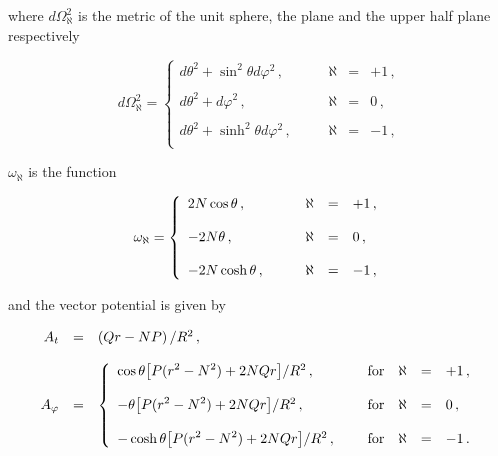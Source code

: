 \documentclass[12pt,a4paper]{article}
\begin{document}
\noindent where $d\Omega_{\aleph}^{2}$ is the metric of the unit sphere, 
the plane and the upper half plane respectively

\begin{equation}
d\Omega^{2}_{\aleph} =
\left\{
\begin{array}{lrcl}
d\theta^{2} +\sin^{2}{\theta}d\varphi^{2}\, ,\hspace{1cm}&
\aleph & = & +1\, ,\\
& & & \\
d\theta^{2} +d\varphi^{2}\, ,& \aleph & = & 0\, ,\\
& & & \\
d\theta^{2} +\sinh^{2}{\theta}d\varphi^{2}\, ,&
\aleph & = & -1\, ,\\
\end{array}
\right.
\end{equation}

\noindent $\omega_{\aleph}$ is the function

\begin{equation}
\omega_{\aleph} =
\left\{
\begin{array}{lrcl}
2N\cos{\theta}\, ,\hspace{1.2cm} & \aleph & = & +1\, ,\\
& & & \\
-2N\theta\, ,& \aleph & = & 0\, ,\\
& & & \\
-2N\cosh{\theta}\, , & \aleph & = & -1\, ,\\
\end{array}
\right.
\end{equation}

\noindent and the vector potential is given by

\begin{equation}
  \begin{array}{rcl}
A_{t} & = & \left( Qr-NP\right) /R^{2}\, ,\\
& & \\
A_{\varphi} & = & 
\left\{
\begin{array}{lcrcl}
\cos{\theta}{\displaystyle\left[P(r^{2}-N^{2}) +2NQr\right]}/R^{2}\, ,
\hspace{.5cm} & {\rm for} & \aleph & = & +1\, ,\\  
 & & & & \\
-\theta {\displaystyle\left[P(r^{2}-N^{2}) +2NQr\right]}/R^{2}\, ,
\hspace{.5cm} & {\rm for} & \aleph & = & 0\, ,\\  
 & & & & \\
-\cosh{\theta}{\displaystyle\left[P(r^{2}-N^{2}) +2NQr\right]}/R^{2}\, ,
\hspace{.5cm} & {\rm for} & \aleph & = & -1\, .\\  
\end{array}
\right.
\end{array}
\end{equation}
\end{document}
